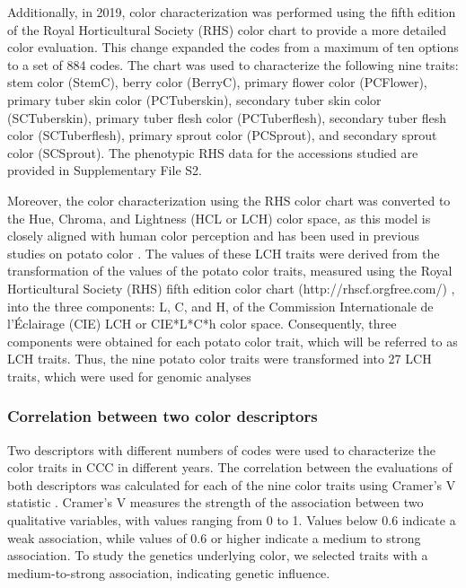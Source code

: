 \documentclass[pdflatex,sn-mathphys-ay]{sn-jnl}%
\begin{document}
Additionally, in 2019, color characterization was performed using the fifth edition of the Royal Horticultural Society (RHS) color chart \citep{voss2002royal} to provide a more detailed color evaluation. This change expanded the codes from a maximum of ten options to a set of 884 codes. The chart was used to characterize the following nine traits: stem color (StemC), berry color (BerryC), primary flower color (PCFlower), primary tuber skin color (PCTuberskin), secondary tuber skin color (SCTuberskin), primary tuber flesh color (PCTuberflesh), secondary tuber flesh color (SCTuberflesh), primary sprout color (PCSprout), and secondary sprout color (SCSprout). The phenotypic RHS data for the accessions studied are provided in Supplementary File S2.






Moreover, the color characterization using the RHS color chart was converted to the Hue, Chroma, and Lightness (HCL or LCH) color space, as this model is closely aligned with human color perception and has been used in previous studies on potato color \citep{caraza2020image}.  The values of these LCH traits were derived from the transformation of the values of the potato color traits, measured using the Royal Horticultural Society (RHS) fifth edition color chart (http://rhscf.orgfree.com/) \citep{voss2002royal}, into the three components: L, C, and H, of the Commission Internationale de l'Éclairage (CIE) LCH or CIE{*}L{*}C{*}h color space. Consequently, three components were obtained for each potato color trait, which will be referred to as LCH traits. Thus, the nine potato color traits were transformed into 27 LCH traits, which were used for genomic analyses 


\subsubsection*{Correlation between two color descriptors}
Two descriptors with different numbers of codes were used to characterize the color traits in CCC in different years. The correlation between the evaluations of both descriptors was calculated for each of the nine color traits using Cramer's V statistic \citep{Lyman1986}. Cramer's V measures the strength of the association between two qualitative variables, with values ranging from 0 to 1. Values below 0.6 indicate a weak association, while values of 0.6 or higher indicate a medium to strong association. To study the genetics underlying color, we selected traits with a medium-to-strong association, indicating genetic influence.
\end{document}
